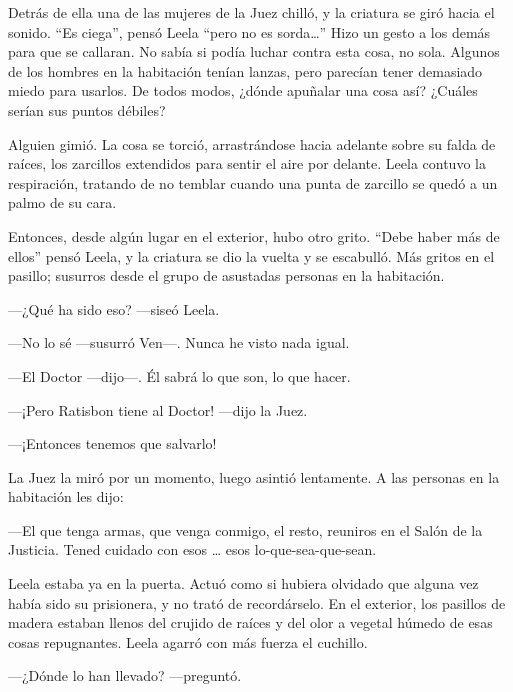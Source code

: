 Detrás de ella una de las mujeres de la Juez chilló, y la criatura se
giró hacia el sonido. ``Es ciega'', pensó Leela ``pero no es
sorda\ldots{}'' Hizo un gesto a los demás para que se callaran. No sabía
si podía luchar contra esta cosa, no sola. Algunos de los hombres en la
habitación tenían lanzas, pero parecían tener demasiado miedo para
usarlos. De todos modos, ¿dónde apuñalar una cosa así? ¿Cuáles serían
sus puntos débiles?

Alguien gimió. La cosa se torció, arrastrándose hacia adelante sobre su
falda de raíces, los zarcillos extendidos para sentir el aire por
delante. Leela contuvo la respiración, tratando de no temblar cuando una
punta de zarcillo se quedó a un palmo de su cara.

Entonces, desde algún lugar en el exterior, hubo otro grito. ``Debe
haber más de ellos'' pensó Leela, y la criatura se dio la vuelta y se
escabulló. Más gritos en el pasillo; susurros desde el grupo de
asustadas personas en la habitación.

---¿Qué ha sido eso? ---siseó Leela.

---No lo sé ---susurró Ven---. Nunca he visto nada igual.

---El Doctor ---dijo---. Él sabrá lo que son, lo que hacer.

---¡Pero Ratisbon tiene al Doctor! ---dijo la Juez.

---¡Entonces tenemos que salvarlo!

La Juez la miró por un momento, luego asintió lentamente. A las personas
en la habitación les dijo:

---El que tenga armas, que venga conmigo, el resto, reuniros en el Salón
de la Justicia. Tened cuidado con esos \ldots{} esos
lo-que-sea-que-sean.

Leela estaba ya en la puerta. Actuó como si hubiera olvidado que alguna
vez había sido su prisionera, y no trató de recordárselo. En el
exterior, los pasillos de madera estaban llenos del crujido de raíces y
del olor a vegetal húmedo de esas cosas repugnantes. Leela agarró con
más fuerza el cuchillo.

---¿Dónde lo han llevado? ---preguntó.